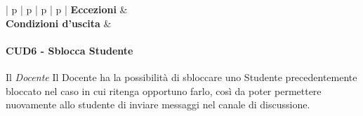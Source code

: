 \begin{table}[!h]
\begin{tabular}{| p{\useCaseLeft} | p{\useCaseNum} | p{\useCaseTwoCol} | p{\useCaseTwoCol} |}
		\hline
		\textbf{Eccezioni} &  \\
		\hline
		\textbf{Condizioni d'uscita} &  \\
		\hline
	\end{tabular}
	\caption{CUD5 - Blocca Studente}
\end{table}


\newpage
\paragraph{CUD6 - Sblocca Studente}
Il \emph{Docente} Il Docente ha la possibilità di sbloccare uno Studente precedentemente bloccato  nel caso in cui ritenga opportuno farlo, così da poter permettere nuovamente allo studente di inviare messaggi nel canale di discussione.    \\
